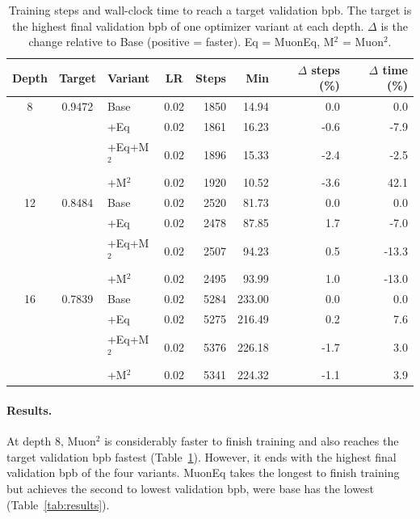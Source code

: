 \documentclass[11pt]{article}
\begin{document}
\begin{table}[t]
    \centering
    \footnotesize
    \setlength{\tabcolsep}{4pt}
    \caption{Training steps and wall-clock time to reach a target validation bpb. The target is the highest final validation bpb of one optimizer variant at each depth. $\Delta$ is the change relative to Base (positive = faster). Eq = MuonEq, M$^2$ = Muon$^2$.}
    \label{tab:time-to-target}
    \begin{tabular}{cclcrrrr}
        \toprule
        Depth & Target & Variant & LR & Steps & Min & $\Delta$ steps (\%) & $\Delta$ time (\%) \\
        \midrule
        8  & 0.9472 & Base      & 0.02 & 1850 & 14.94  &  0.0 &   0.0 \\
           &        & +Eq       & 0.02 & 1861 & 16.23  & -0.6 &  -7.9 \\
           &        & +Eq+M$^2$ & 0.02 & 1896 & 15.33  & -2.4 &  -2.5 \\
           &        & +M$^2$    & 0.02 & 1920 & 10.52  & -3.6 &  42.1 \\
        \midrule
        12 & 0.8484 & Base      & 0.02 & 2520 & 81.73  &  0.0 &   0.0 \\
           &        & +Eq       & 0.02 & 2478 & 87.85  &  1.7 &  -7.0 \\
           &        & +Eq+M$^2$ & 0.02 & 2507 & 94.23  &  0.5 & -13.3 \\
           &        & +M$^2$    & 0.02 & 2495 & 93.99  &  1.0 & -13.0 \\
        \midrule
        16 & 0.7839 & Base      & 0.02 & 5284 & 233.00 &  0.0 &   0.0 \\
           &        & +Eq       & 0.02 & 5275 & 216.49 &  0.2 &   7.6 \\
           &        & +Eq+M$^2$ & 0.02 & 5376 & 226.18 & -1.7 &   3.0 \\
           &        & +M$^2$    & 0.02 & 5341 & 224.32 & -1.1 &   3.9 \\
        \bottomrule
    \end{tabular}
\end{table}



\paragraph{Results.}
At depth 8, Muon$^2$ is considerably faster to finish training and also reaches the target validation bpb fastest (Table~\ref{tab:time-to-target}). However, it ends with the highest final validation bpb of the four variants. MuonEq takes the longest to finish training but achieves the second to lowest validation bpb, were base has the lowest (Table~\ref{tab:results}).
\end{document}
